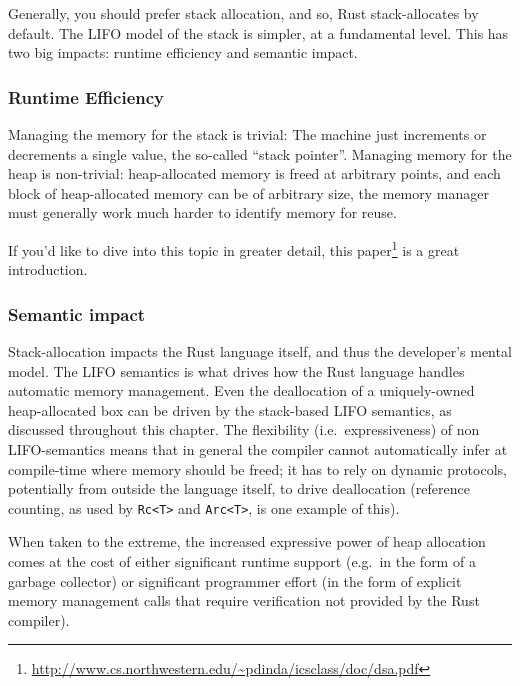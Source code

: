 \documentclass[a4paper,]{book}
\renewcommand{\href}[2]{#2\footnote{\url{#1}}}
\begin{document}
Generally, you should prefer stack allocation, and so, Rust
stack-allocates by default. The LIFO model of the stack is simpler, at a
fundamental level. This has two big impacts: runtime efficiency and
semantic impact.

\subsubsection{Runtime Efficiency}\label{runtime-efficiency}

Managing the memory for the stack is trivial: The machine just
increments or decrements a single value, the so-called ``stack
pointer''. Managing memory for the heap is non-trivial: heap-allocated
memory is freed at arbitrary points, and each block of heap-allocated
memory can be of arbitrary size, the memory manager must generally work
much harder to identify memory for reuse.

If you'd like to dive into this topic in greater detail,
\href{http://www.cs.northwestern.edu/~pdinda/icsclass/doc/dsa.pdf}{this
paper} is a great introduction.

\subsubsection{Semantic impact}\label{semantic-impact}

Stack-allocation impacts the Rust language itself, and thus the
developer's mental model. The LIFO semantics is what drives how the Rust
language handles automatic memory management. Even the deallocation of a
uniquely-owned heap-allocated box can be driven by the stack-based LIFO
semantics, as discussed throughout this chapter. The flexibility
(i.e.~expressiveness) of non LIFO-semantics means that in general the
compiler cannot automatically infer at compile-time where memory should
be freed; it has to rely on dynamic protocols, potentially from outside
the language itself, to drive deallocation (reference counting, as used
by \texttt{Rc\textless{}T\textgreater{}} and
\texttt{Arc\textless{}T\textgreater{}}, is one example of this).

When taken to the extreme, the increased expressive power of heap
allocation comes at the cost of either significant runtime support
(e.g.~in the form of a garbage collector) or significant programmer
effort (in the form of explicit memory management calls that require
verification not provided by the Rust compiler).

\end{document}
